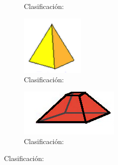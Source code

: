 \begin{figure}[H]
\begin{subfigure}{.18\linewidth}
        \caption{Clasificación:\\\fillin[poliedro][1.6cm]}
        \label{sfig:sinma2_aiu3_ac79_img02}
    \end{subfigure}\qquad
    \begin{subfigure}{.18\linewidth}
        \centering
        \includegraphics[width=\linewidth]{../images/sinma2_aiu3_ac79_img03}
        \caption{Clasificación:\\\fillin[pirámide][1.6cm]}
        \label{sfig:sinma2_aiu3_ac79_img03}
    \end{subfigure}
    \qquad
    \begin{subfigure}{.25\linewidth}
        \centering
        \includegraphics[width=.8\linewidth]{../images/sinma2_aiu3_ac79_img04}
        \caption{Clasificación:\\}
        \label{sfig:sinma2_aiu3_ac79_img04}
    \end{subfigure}

\end{figure}
